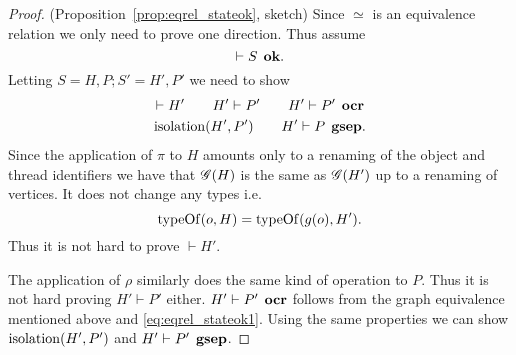 \begin{proof}{(Proposition~\ref{prop:eqrel_stateok}, sketch)}
  Since $\simeq$ is an equivalence relation we only need to prove one direction.
  Thus assume
  \begin{equation}
    \vdash S \:\: \mbox{\bf ok}.
  \end{equation}
  Letting $S = H, P; S' = H', P'$ we need to show
  \begin{equation} 
    \begin{gathered}
      \vdash H' \quad\quad H' \vdash P' \quad\quad H' \vdash P' \:\: \mbox{\bf ocr} \\
      \mbox{$\mathrm{isolation}$}(H', P') \quad\quad H' \vdash P \:\: \mbox{\bf gsep}.
    \end{gathered}
  \end{equation}
  Since the application of $\pi$ to $H$ amounts only to a renaming of the object
  and thread identifiers we have that $\mathscr{G}(H)$ is the same as $\mathscr{G}(H')$ up to a
  renaming of vertices. It does not change any types i.e. 
  \begin{equation} \label{eq:eqrel_stateok1}
    \mbox{$\mathrm{typeOf}$}(o, H) = \mbox{$\mathrm{typeOf}$}(g(o), H').
  \end{equation}
  Thus it is not hard to prove $\vdash H'$. 
  
  The application of $\rho$ similarly does the same kind of operation to $P$.
  Thus it is not hard proving $H' \vdash P'$ either.
  $H' \vdash P' \:\: \mbox{\bf ocr}$ follows from the graph equivalence mentioned above
  and \eqref{eq:eqrel_stateok1}. Using the same properties we can show
  $\mbox{$\mathrm{isolation}$}(H', P')$ and $H' \vdash P' \:\: \mbox{\bf gsep}$.
\end{proof}

